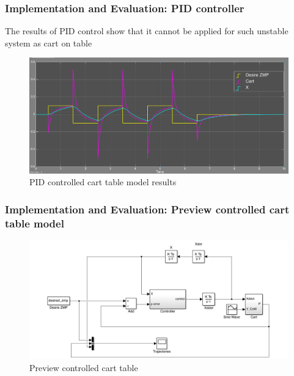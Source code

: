 \documentclass{beamer}
\begin{document}

	\begin{frame}
		\frametitle{Implementation and Evaluation: PID controller}
		The results of PID control show that it cannot be applied for such unstable system as cart on table
		
		\begin{figure}[h!]
			\centering
			\includegraphics[width=\linewidth]{presentation_images/21}
			\caption{PID controlled cart table model results}
		\end{figure}
	\end{frame}
	

	\begin{frame}
		\frametitle{Implementation and Evaluation: Preview controlled cart table model}
		\begin{figure}[h!]
			\centering
			\includegraphics[width=\linewidth]{presentation_images/22}
			\caption{Preview controlled cart table}
		\end{figure}
	\end{frame}
	
\end{document}
